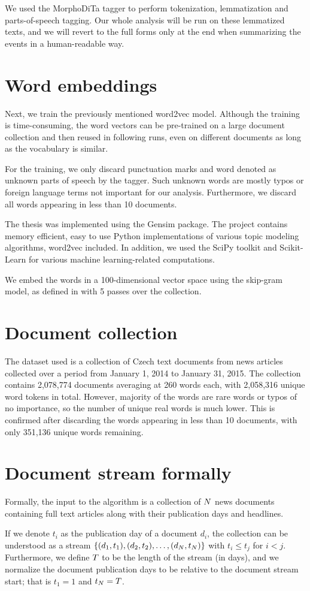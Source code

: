 We used the MorphoDiTa tagger \cite{morphodita} to perform tokenization, lemmatization and parts-of-speech tagging. Our whole analysis will be run on these lemmatized texts, and we will revert to the full forms only at the end when summarizing the events in a human-readable way.


\section{Word embeddings} \label{word-embeddings}
Next, we train the previously mentioned word2vec model. Although the training is time-consuming, the word vectors can be pre-trained on a large document collection and then reused in following runs, even on different documents as long as the vocabulary is similar.

For the training, we only discard punctuation marks and word denoted as unknown parts of speech by the tagger. Such unknown words are mostly typos or foreign language terms not important for our analysis. Furthermore, we discard all words appearing in less than 10 documents.

The thesis was implemented using the Gensim \cite{gensim} package. The project contains memory efficient, easy to use Python implementations of various topic modeling algorithms, word2vec included. In addition, we used the SciPy toolkit \cite{scipy} and Scikit-Learn \cite{scikit-learn} for various machine learning-related computations.

We embed the words in a 100-dimensional vector space using the skip-gram model, as defined in \cite{word2vec} with 5 passes over the collection.


\section{Document collection}
The dataset used is a collection of Czech text documents from news articles collected over a period from January 1, 2014 to January 31, 2015. The collection contains 2,078,774 documents averaging at 260 words each, with 2,058,316 unique word tokens in total. However, majority of the words are rare words or typos of no importance, so the number of unique real words is much lower. This is confirmed after discarding the words appearing in less than 10 documents, with only 351,136 unique words remaining.


\section{Document stream formally}
Formally, the input to the algorithm is a collection of $N$ news documents containing full text articles along with their publication days and headlines.

If we denote $t_{i}$ as the publication day of a document $d_{i}$, the collection can be understood as a stream $\left\{ (d_{1}, t_{1}), (d_{2}, t_{2}), \dots, (d_{N}, t_{N}) \right\}$ with $t_{i} \leq t_{j}$ for $i < j$. Furthermore, we define $T$ to be the length of the stream (in days), and we normalize the document publication days to be relative to the document stream start; that is $t_{1} = 1$ and $t_{N} = T$.